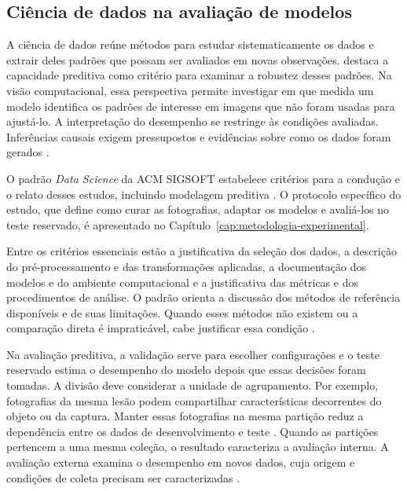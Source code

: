 \subsection{Ciência de dados na avaliação de modelos}
\label{subsec:ciencia-de-dados}

A ciência de dados reúne métodos para estudar sistematicamente os dados e
extrair deles padrões que possam ser avaliados em novas observações.
 destaca a capacidade preditiva como critério para
examinar a robustez desses padrões. Na visão computacional, essa perspectiva
permite investigar em que medida um modelo identifica os padrões de
interesse em imagens que não foram usadas para ajustá-lo. A interpretação
do desempenho se restringe às condições avaliadas. Inferências causais
exigem pressupostos e evidências sobre como os dados foram gerados
\cite{dhar2013}.

O padrão \textit{Data Science} da ACM SIGSOFT estabelece critérios para a
condução e o relato desses estudos, incluindo modelagem preditiva
\cite{acmSigsoftDataScience}. O protocolo específico do estudo, que define
como curar as fotografias, adaptar os modelos e avaliá-los no teste
reservado, é apresentado no
Capítulo~\ref{cap:metodologia-experimental}.

Entre os critérios essenciais estão a justificativa da seleção dos dados,
a descrição do pré-processamento e das transformações aplicadas, a
documentação dos modelos e do ambiente computacional e a justificativa das
métricas e dos procedimentos de análise. O padrão orienta a discussão dos
métodos de referência disponíveis e de suas limitações. Quando esses
métodos não existem ou a comparação direta é impraticável, cabe justificar
essa condição \cite{acmSigsoftDataScience}.

Na avaliação preditiva, a validação serve para escolher configurações
e o teste reservado estima o desempenho do modelo depois que essas
decisões foram tomadas. A divisão deve considerar a unidade de
agrupamento. Por exemplo, fotografias da mesma lesão podem compartilhar
características decorrentes do objeto ou da captura. Manter essas
fotografias na mesma partição reduz a dependência entre os dados
de desenvolvimento e teste \cite{kapoor2023}. Quando as partições
pertencem a uma mesma coleção, o resultado caracteriza a avaliação
interna. A avaliação externa examina o desempenho em novos dados,
cuja origem e condições de coleta precisam ser caracterizadas
\cite{muneer2026realfm}.

